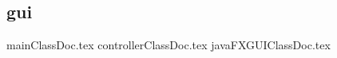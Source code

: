 \subsection{gui}
\label{ss:gui}

{mainClassDoc.tex}
{controllerClassDoc.tex}
{javaFXGUIClassDoc.tex}